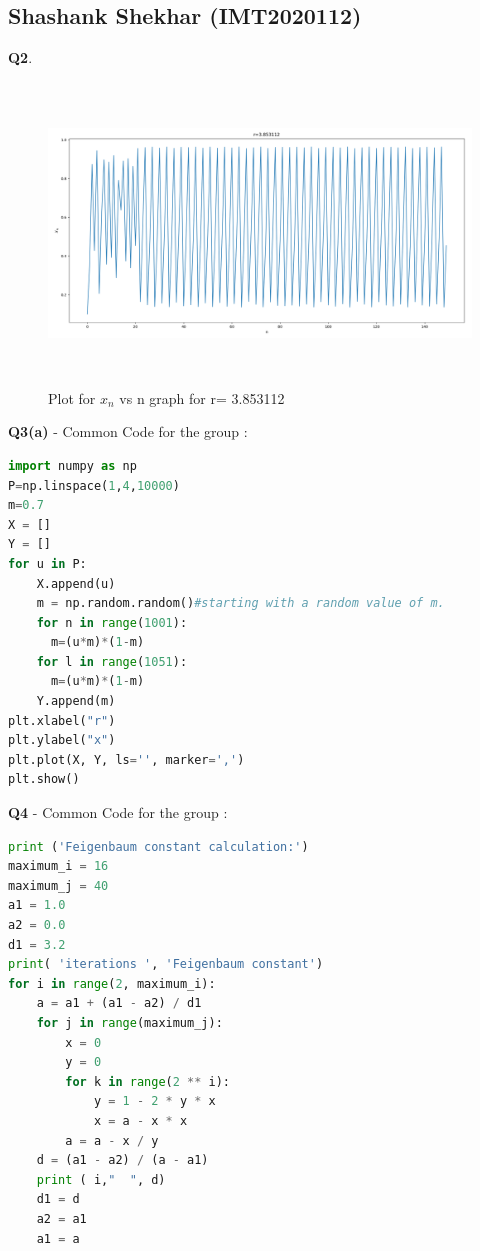 \documentclass[11pt]{scrartcl} %
\begin{document}
\subsection{Shashank Shekhar (IMT2020112)}
\textbf{Q2}.
\begin{figure}[h] %
	\centering
	\includegraphics[width=12cm, height=8cm]{shashank.png} %
	\caption {Plot for $x_n$ vs n graph for r= 3.853112}
\end{figure}
\newpage
\textbf{Q3(a)} - Common Code for the group :\par
\begin{lstlisting}[language=Python, caption= Bifurcation diagram]
import numpy as np
P=np.linspace(1,4,10000)
m=0.7
X = []
Y = []
for u in P:
    X.append(u)
    m = np.random.random()#starting with a random value of m.
    for n in range(1001):
      m=(u*m)*(1-m)
    for l in range(1051):
      m=(u*m)*(1-m)
    Y.append(m)
plt.xlabel("r")
plt.ylabel("x")
plt.plot(X, Y, ls='', marker=',')
plt.show()
\end{lstlisting}
\textbf{Q4} - Common Code for the group :\par
\begin{lstlisting}[language=Python, caption= Feigenbaum constants]
print ('Feigenbaum constant calculation:')
maximum_i = 16
maximum_j = 40
a1 = 1.0
a2 = 0.0
d1 = 3.2
print( 'iterations ', 'Feigenbaum constant')
for i in range(2, maximum_i):
    a = a1 + (a1 - a2) / d1
    for j in range(maximum_j):
        x = 0
        y = 0
        for k in range(2 ** i):
            y = 1 - 2 * y * x
            x = a - x * x    
        a = a - x / y
    d = (a1 - a2) / (a - a1)
    print ( i,"  ", d)
    d1 = d
    a2 = a1
    a1 = a
\end{lstlisting}
\end{document}
